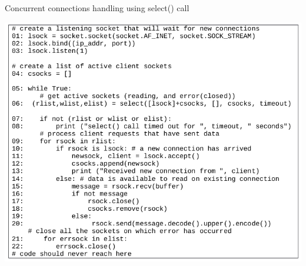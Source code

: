\begin{table}[H]
\centering
\caption{Concurrent connections handling using select() call}\label{fig13}
\includegraphics[scale=2.95]{src/Figures/chap1/fig13.jpg}
\end{table}

